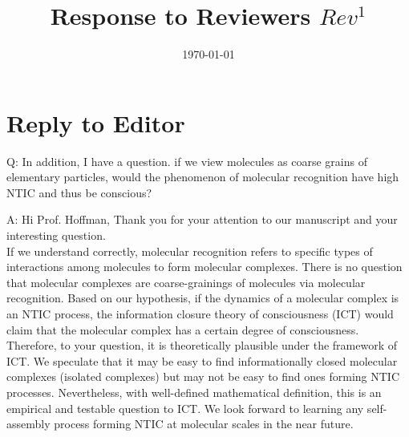 \documentclass[utf8]{article}
\title{Response to Reviewers $Rev^1$}
\date{\today}
\author{}
\newcounter{cQuestion}[section]
\newenvironment{question}
    {\refstepcounter{cQuestion}\color{Blue}\noindent\newline Q\thecQuestion:}
    {~\newline}
\newenvironment{ans}  
    {\color{Black}\noindent A:}
    {~\newline}
\begin{document}
    \maketitle
    \section*{Reply to Editor}
        \begin{question}
        In addition, I have a question. if we view molecules as coarse grains of elementary particles, would the phenomenon of molecular recognition have high NTIC and thus be conscious?
        \end{question}
        
        \begin{ans}
            Hi Prof. Hoffman,
            Thank you for your attention to our manuscript and your interesting question. \\
            If we understand correctly, molecular recognition refers to specific types of interactions among molecules to form molecular complexes. There is no question that molecular complexes are coarse-grainings of molecules via molecular recognition. Based on our hypothesis, if the dynamics of a molecular complex is an NTIC process, the information closure theory of consciousness (ICT) would claim that the molecular complex has a certain degree of consciousness. Therefore, to your question, it is theoretically plausible under the framework of ICT. We speculate that it may be easy to find informationally closed molecular complexes (isolated complexes) but may not be easy to find ones forming NTIC processes. Nevertheless, with well-defined mathematical definition, this is an empirical and testable question to ICT. We look forward to learning any self-assembly process forming NTIC at molecular scales in the near future.        
        \end{ans}
        
    
\end{document}

